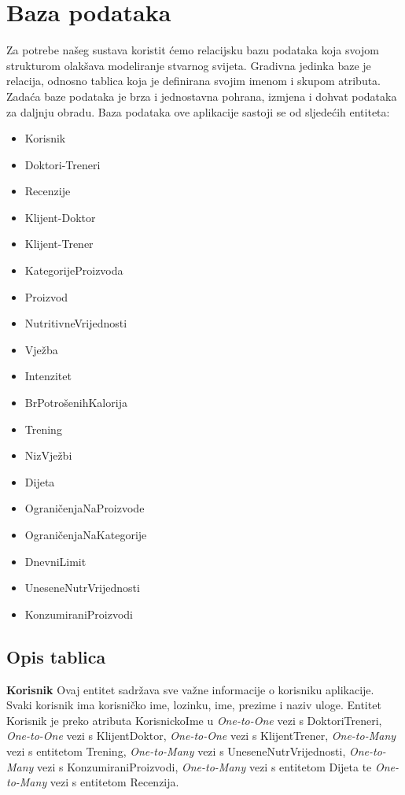 		\section{Baza podataka}
			
			Za potrebe našeg sustava koristit ćemo relacijsku bazu podataka koja svojom strukturom olakšava modeliranje stvarnog svijeta. Gradivna jedinka baze je relacija, odnosno tablica koja je definirana svojim imenom i skupom atributa. Zadaća baze podataka je brza i jednostavna pohrana, izmjena i dohvat podataka za daljnju obradu.
			Baza podataka ove aplikacije sastoji se od sljedećih entiteta:
			\begin{itemize}
				\item {Korisnik}
				\item {Doktori-Treneri}
				\item {Recenzije}
				\item {Klijent-Doktor}
				\item {Klijent-Trener}
				\item {KategorijeProizvoda}
				\item {Proizvod}
				\item {NutritivneVrijednosti}
				\item {Vježba}
				\item {Intenzitet}
				\item {BrPotrošenihKalorija}
				\item {Trening}
				\item {NizVježbi}
				\item {Dijeta}
				\item {OgraničenjaNaProizvode}
				\item {OgraničenjaNaKategorije}
				\item {DnevniLimit}
				\item {UneseneNutrVrijednosti}
				\item {KonzumiraniProizvodi}
			\end{itemize}
			
			
		
			\subsection{Opis tablica}
			

				\textbf{Korisnik} Ovaj entitet sadržava sve važne informacije o korisniku aplikacije. Svaki korisnik ima korisničko ime, lozinku, ime, prezime i naziv uloge. Entitet Korisnik je preko atributa KorisnickoIme u \textit{One-to-One} vezi s DoktoriTreneri, \textit{One-to-One} vezi s KlijentDoktor, \textit{One-to-One} vezi s KlijentTrener, \textit{One-to-Many} vezi s entitetom Trening, \textit{One-to-Many} vezi s UneseneNutrVrijednosti, \textit{One-to-Many} vezi s KonzumiraniProizvodi, \textit{One-to-Many} vezi s entitetom Dijeta te \textit{One-to-Many} vezi s entitetom Recenzija.
				
